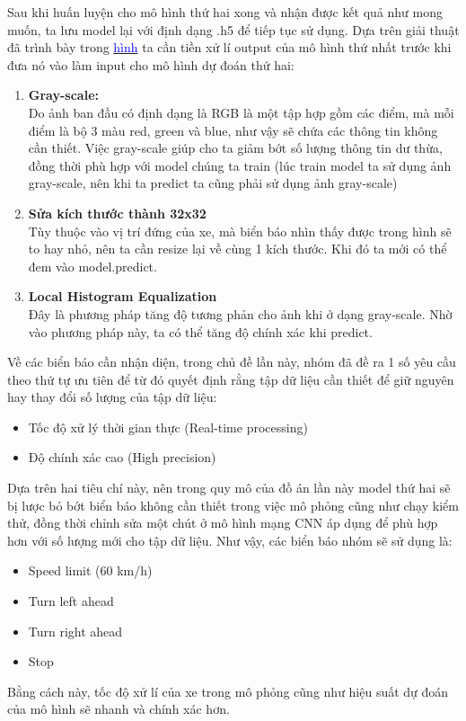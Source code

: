 Sau khi huấn luyện cho mô hình thứ hai xong và nhận được kết quả như mong muốn, ta lưu model lại với định dạng .h5 để tiếp tục sử dụng. Dựa trên giải thuật đã trình bày trong \hyperlink{fig:algo}{\textcolor{blue}{hình}} ta cần tiền xử lí output của mô hình thứ nhất trước khi đưa nó vào làm input cho mô hình dự đoán thứ hai:
\begin{enumerate}
    \item \textbf{Gray-scale:} \\
    Do ảnh ban đầu có định dạng là RGB là một tập hợp gồm các điểm, mà mỗi điểm là bộ 3 màu red, green và blue, như vậy sẽ chứa các thông tin không cần thiết. Việc gray-scale giúp cho ta giảm bớt số lượng thông tin dư thừa, đồng thời phù hợp với model chúng ta train (lúc train model ta sử dụng ảnh gray-scale, nên khi ta predict ta cũng phải sử dụng ảnh gray-scale)
    \item \textbf{Sửa kích thước thành 32x32}\\
    Tùy thuộc vào vị trí đứng của xe, mà biển báo nhìn thấy được trong hình sẽ to hay nhỏ,
nên ta cần resize lại về cùng 1 kích thước. Khi đó ta mới có thể đem vào model.predict.
    \item \textbf{Local Histogram Equalization}\\
    Đây là phương pháp tăng độ tương phản cho ảnh khi ở dạng gray-scale. Nhờ vào phương
pháp này, ta có thể tăng độ chính xác khi predict.
\end{enumerate}
Về các biển báo cần nhận diện, trong chủ đề lần này, nhóm đã đề ra 1 số yêu cầu theo thứ tự ưu tiên để từ đó quyết định rằng tập dữ liệu cần thiết để giữ nguyên hay thay đổi số lượng của tập dữ liệu:
\begin{itemize}
    \item Tốc độ xử lý thời gian thực (Real-time processing)
    \item Độ chính xác cao (High precision)
\end{itemize}
Dựa trên hai tiêu chí này, nên trong quy mô của đồ án lần này model thứ hai sẽ bị lược bỏ bớt biển báo không cần thiết trong việc mô phỏng cũng như chạy kiểm thử, đồng thời chỉnh sửa một chút ở mô hình mạng CNN áp dụng để phù hợp hơn với số lượng mới cho tập dữ liệu. Như vậy, các biển báo nhóm sẽ sử dụng là:
\begin{itemize}
    \item Speed limit (60 km/h)
    \item Turn left ahead
    \item Turn right ahead
    \item Stop
\end{itemize}
Bằng cách này, tốc độ xử lí của xe trong mô phỏng cũng như hiệu suất dự đoán của mô hình sẽ nhanh và chính xác hơn. 
